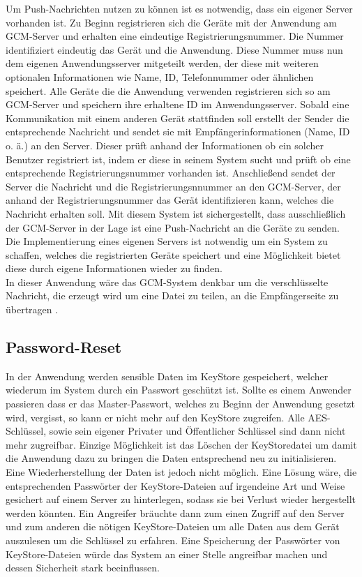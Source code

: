 \documentclass[10pt, a4paper,headsepline]{scrreprt}
\begin{document}
Um Push-Nachrichten nutzen zu können ist es notwendig, dass ein eigener Server vorhanden ist. Zu Beginn registrieren sich die Geräte mit der Anwendung am GCM-Server und erhalten eine eindeutige Registrierungsnummer. Die Nummer identifiziert eindeutig das Gerät und die Anwendung. Diese Nummer muss nun dem eigenen Anwendungsserver mitgeteilt werden, der diese mit weiteren optionalen Informationen wie Name, ID, Telefonnummer oder ähnlichen speichert. Alle Geräte die die Anwendung verwenden registrieren sich so am GCM-Server und speichern ihre erhaltene ID im Anwendungsserver. Sobald eine Kommunikation mit einem anderen Gerät stattfinden soll erstellt der Sender die entsprechende Nachricht und sendet sie mit Empfängerinformationen (Name, ID o. ä.) an den Server. Dieser prüft anhand der Informationen ob ein solcher Benutzer registriert ist, indem er diese in seinem System sucht und prüft ob eine entsprechende Registrierungsnummer vorhanden ist. Anschließend sendet der Server die Nachricht und die Registrierungsnnummer an den GCM-Server, der anhand der Registrierungsnummer das Gerät identifizieren kann, welches die Nachricht erhalten soll. Mit diesem System ist sichergestellt, dass ausschließlich der GCM-Server in der Lage ist eine Push-Nachricht an die Geräte zu senden. Die Implementierung eines eigenen Servers ist notwendig um ein System zu schaffen, welches die registrierten Geräte speichert und eine Möglichkeit bietet diese durch eigene Informationen wieder zu finden. \\
In dieser Anwendung wäre das GCM-System denkbar um die verschlüsselte Nachricht, die erzeugt wird um eine Datei zu teilen, an die Empfängerseite zu übertragen \cite{website:gcm-main}.


\subsection{Password-Reset}
In der Anwendung werden sensible Daten im KeyStore gespeichert, welcher wiederum im System durch ein Passwort geschützt ist. Sollte es einem Anwender passieren dass er das Master-Passwort, welches zu Beginn der Anwendung gesetzt wird, vergisst, so kann er nicht mehr auf den KeyStore zugreifen. Alle AES-Schlüssel, sowie sein eigener Privater und Öffentlicher Schlüssel sind dann nicht mehr zugreifbar. Einzige Möglichkeit ist das Löschen der KeyStoredatei um damit die Anwendung dazu zu bringen die Daten entsprechend neu zu initialisieren. Eine Wiederherstellung der Daten ist jedoch nicht möglich. Eine Lösung wäre, die entsprechenden Passwörter der KeyStore-Dateien auf irgendeine Art und Weise gesichert auf einem Server zu hinterlegen, sodass sie bei Verlust wieder hergestellt werden könnten. Ein Angreifer bräuchte dann zum einen Zugriff auf den Server und zum anderen die nötigen KeyStore-Dateien um alle Daten aus dem Gerät auszulesen um die Schlüssel zu erfahren. Eine Speicherung der Passwörter von KeyStore-Dateien würde das System an einer Stelle angreifbar machen und dessen Sicherheit stark beeinflussen.
\end{document}

